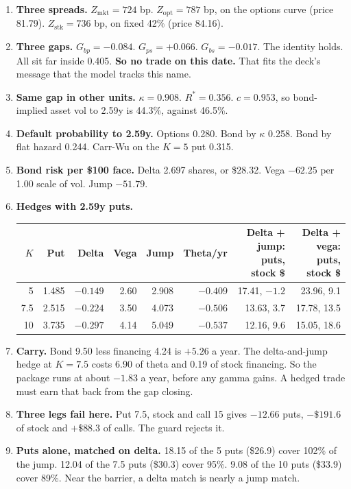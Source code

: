 \documentclass[10pt,a4paper]{article}
\newcommand{\Zm}{Z_{\mathrm{mkt}}}
\newcommand{\Zo}{Z_{\mathrm{opt}}}
\newcommand{\Zs}{Z_{\mathrm{stk}}}
\newcommand{\Gbp}{G_{bp}}
\newcommand{\Gbs}{G_{bs}}
\newcommand{\Gps}{G_{ps}}
\begin{document}
\begin{enumerate}[leftmargin=*,itemsep=2pt]
\item \textbf{Three spreads.} $\Zm=724$ bp. $\Zo=787$ bp, on the options curve (price 81.79). $\Zs=736$ bp, on fixed 42\% (price 84.16).
\item \textbf{Three gaps.} $\Gbp=-0.084$. $\Gps=+0.066$. $\Gbs=-0.017$. The identity holds. All sit far inside 0.405. \textbf{So no trade on this date.} That fits the deck's message that the model tracks this name.
\item \textbf{Same gap in other units.} $\kappa=0.908$. $R^*=0.356$. $c=0.953$, so bond-implied asset vol to 2.59y is 44.3\%, against 46.5\%.
\item \textbf{Default probability to 2.59y.} Options 0.280. Bond by $\kappa$ 0.258. Bond by flat hazard 0.244. Carr-Wu on the $K=5$ put 0.315.
\item \textbf{Bond risk per \$100 face.} Delta 2.697 shares, or \$28.32. Vega $-62.25$ per 1.00 scale of vol. Jump $-51.79$.
\item \textbf{Hedges with 2.59y puts.}
\begin{center}
\footnotesize
\begin{tabular}{@{}rrrrrrrr@{}}
\toprule
$K$ & Put & Delta & Vega & Jump & Theta/yr & Delta + jump: puts, stock \$ & Delta + vega: puts, stock \$\\
\midrule
5 & 1.485 & $-0.149$ & 2.60 & 2.908 & $-0.409$ & 17.41, $-1.2$ & 23.96, 9.1\\
7.5 & 2.515 & $-0.224$ & 3.50 & 4.073 & $-0.506$ & 13.63, 3.7 & 17.78, 13.5\\
10 & 3.735 & $-0.297$ & 4.14 & 5.049 & $-0.537$ & 12.16, 9.6 & 15.05, 18.6\\
\bottomrule
\end{tabular}
\end{center}
\item \textbf{Carry.} Bond 9.50 less financing 4.24 is $+5.26$ a year. The delta-and-jump hedge at $K=7.5$ costs 6.90 of theta and 0.19 of stock financing. So the package runs at about $-1.83$ a year, before any gamma gains. A hedged trade must earn that back from the gap closing.
\item \textbf{Three legs fail here.} Put 7.5, stock and call 15 gives $-12.66$ puts, $-\$191.6$ of stock and $+\$88.3$ of calls. The guard rejects it.
\item \textbf{Puts alone, matched on delta.} 18.15 of the 5 puts (\$26.9) cover 102\% of the jump. 12.04 of the 7.5 puts (\$30.3) cover 95\%. 9.08 of the 10 puts (\$33.9) cover 89\%. Near the barrier, a delta match is nearly a jump match.

\end{enumerate}
\end{document}
